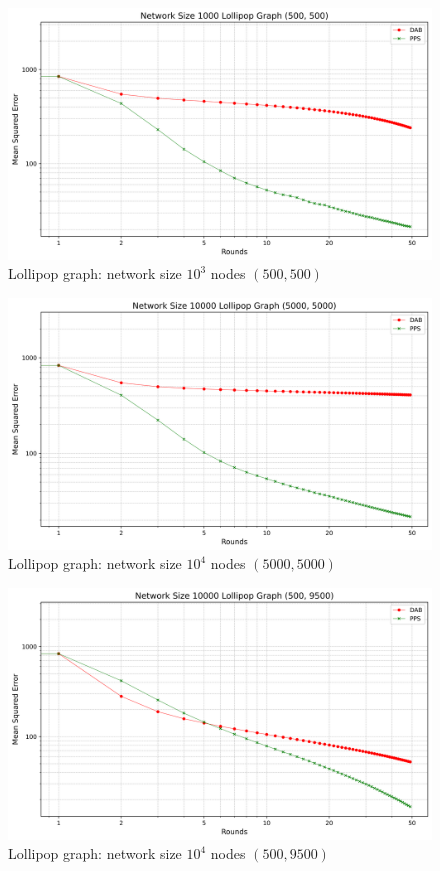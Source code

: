 \begin{figure}[H]
    \centering
    \includegraphics[scale=0.5]{figures/lollipopGraphSimulations/DAB_vs_PPS_LG_r50_n1000.png}
    \caption{Lollipop graph: network size $10^{3}$ nodes $(500, 500)$}
    \label{fig:500+500lollipopgraph}
\end{figure}
\begin{figure}[H]
    \centering
    \includegraphics[scale=0.5]{figures/lollipopGraphSimulations/5000+5000/DAB_vs_PPS_LG_r50_n10000.png}
    \caption{Lollipop graph: network size $10^{4}$ nodes $(5000, 5000)$}
    \label{fig:5000+5000lollipopgraph}
\end{figure}
\begin{figure}[H]
    \centering
    \includegraphics[scale=0.5]{figures/lollipopGraphSimulations/500+9500/DAB_vs_PPS_LG_r50_n10000.png}
    \caption{Lollipop graph: network size $10^{4}$ nodes $(500, 9500)$}
    \label{fig:500+9500lollipopgraph}
\end{figure}
